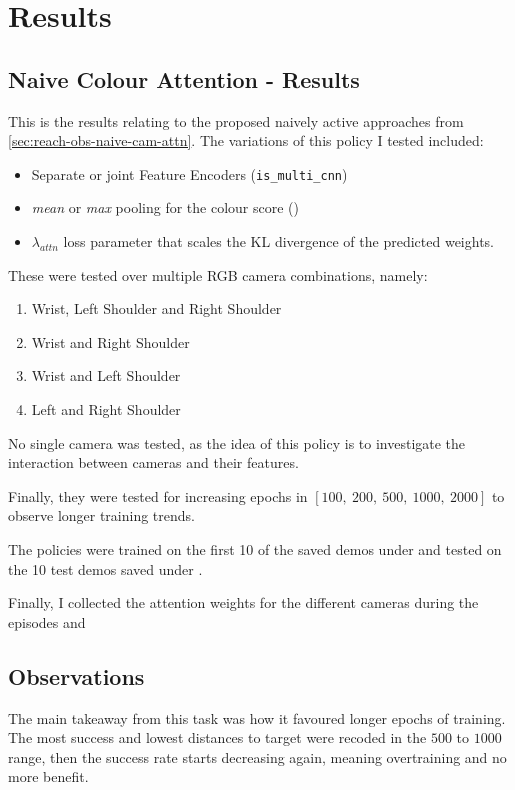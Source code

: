 \section{Results}

\subsection{Naive Colour Attention - Results}
This is the results relating to the proposed naively active approaches from \ref{sec:reach-obs-naive-cam-attn}.
The variations of this policy I tested included: 
\begin{itemize}
  \item Separate or joint Feature Encoders (\verb|is_multi_cnn|)
  \item \emph{mean} or \emph{max} pooling for the colour score (\verb||)
  \item $\lambda_{attn}$ loss parameter that scales the KL divergence of the predicted 
  weights.
\end{itemize}
These were tested over multiple RGB camera combinations, namely:
\begin{enumerate}
  \item Wrist, Left Shoulder and Right Shoulder
  \item Wrist and Right Shoulder
  \item Wrist and Left Shoulder
  \item Left and Right Shoulder
\end{enumerate}
No single camera was tested, as the idea of this policy is to investigate the interaction between cameras and their features.

Finally, they were tested for increasing epochs in \(\left[100, ~200, ~500, ~1000, ~2000\right]\) to observe longer training trends.

The policies were trained on the first 10 of the saved demos under  and tested on the 10 test demos saved under .

Finally, I collected the attention weights for the different cameras during the episodes and 

\subsection{Observations}
The main takeaway from this task was how it favoured longer epochs of training. The most success and lowest distances to target were recoded in the $500$ to $1000$ range, then the success rate starts decreasing again, meaning overtraining and no more benefit.\todo[color=purple]{}


